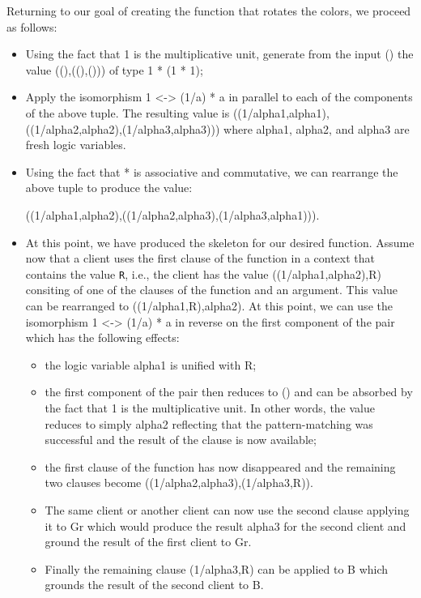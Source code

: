 \documentclass[preprint]{sigplanconf}
\begin{document}
Returning to our goal of creating the function that rotates the colors, we
proceed as follows:
\begin{itemize}
\item Using the fact that {{1}} is the multiplicative unit, generate from the
  input {{()}} the value {{((),((),()))}} of type {{1 * (1 * 1)}};
\item Apply the isomorphism {{1 <-> (1/a) * a}} in parallel to each of the
  components of the above tuple. The resulting value is 
{{((1/alpha1,alpha1),((1/alpha2,alpha2),(1/alpha3,alpha3)))}} where {{alpha1}},
{{alpha2}}, and {{alpha3}} are fresh logic variables.
\item Using the fact that {{*}} is associative and commutative, we can
  rearrange the above tuple to produce the value:

{{((1/alpha1,alpha2),((1/alpha2,alpha3),(1/alpha3,alpha1)))}}.
\item At this point, we have produced the skeleton for our desired function.
  Assume now that a client uses the first clause of the function in a context
  that contains the value \verb|R|, i.e., the client has the value
  {{((1/alpha1,alpha2),R)}} consiting of one of the clauses of the function
  and an argument. This value can be rearranged to {{((1/alpha1,R),alpha2)}}.
  At this point, we can use the isomorphism {{1 <-> (1/a) * a}} in reverse on
  the first component of the pair which has the following effects:
  \begin{itemize}
    \item the logic variable {{alpha1}} is unified with {{R}};
    \item the first component of the pair then reduces to () and can be
      absorbed by the fact that {{1}} is the multiplicative unit. In other
      words, the value reduces to simply {{alpha2}} reflecting that the
      pattern-matching was successful and the result of the clause is now
      available;
    \item the first clause of the function has now disappeared and the
      remaining two clauses become {{((1/alpha2,alpha3),(1/alpha3,R))}}.
  \item The same client or another client can now use the second clause
    applying it to {{Gr}} which would produce the result {{alpha3}} for the
    second client and ground the result of the first client to {{Gr}}.
  \item Finally the remaining clause {{(1/alpha3,R)}} can be applied to {{B}}
    which grounds the result of the second client to {{B}}.
  \end{itemize}
\end{itemize}
\end{document}
